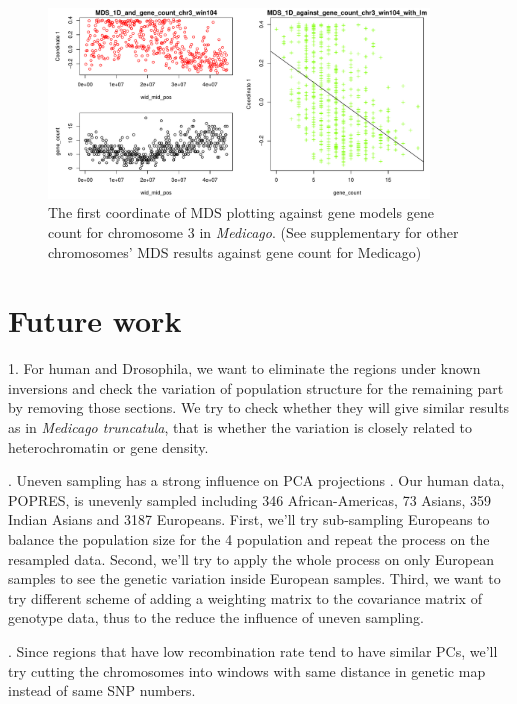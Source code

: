 \documentclass[11pt, oneside]{article}   	%
\begin{document}
\begin{figure}
    \begin{center}
       \includegraphics[width=0.9\textwidth]{Fig6_MDS_1D_and_gene_count_and_lm_chr3_based_all_chr_win104}
    \end{center}
    \caption{
        The first coordinate of MDS plotting against gene models gene count for chromosome 3 in \textit{Medicago}. (See supplementary for other chromosomes' MDS results against gene count for Medicago)
        \label{fig:pde_clines}
    }
\end{figure}

\section{Future work}
1. For human and Drosophila, we want to eliminate the regions under known inversions and check the variation of population structure for the remaining part by removing those sections. We try to check whether they will give similar results as in \textit{Medicago truncatula}, that is whether the variation is closely related to heterochromatin or gene density.

. Uneven sampling has a strong influence on PCA projections \citep{mcvean2009genealogical}. 
Our human data, POPRES, is unevenly sampled including 346 African-Americas, 73 Asians, 359 Indian Asians and 3187 Europeans. 
First, we'll try sub-sampling Europeans to balance the population size for the 4 population and repeat the process on the resampled data. 
Second, we'll try to apply the whole process on only European samples to see the genetic variation inside European samples. 
Third, we want to try different scheme of adding a weighting matrix to the covariance matrix of genotype data, thus to the reduce the influence of uneven sampling.

. Since regions that have low recombination rate tend to have similar PCs, we'll try cutting the chromosomes into windows with same distance in genetic map instead of same SNP numbers.
\end{document}
